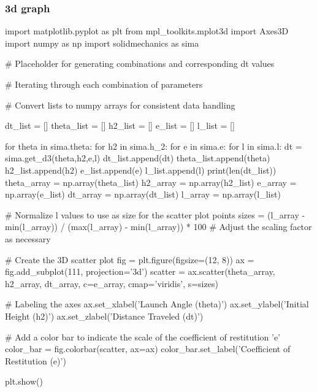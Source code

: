 \documentclass{article}
\begin{document}
    \subsubsection{3d graph}\label{ap:3d_code}
    \begin{python}
import matplotlib.pyplot as plt
from mpl_toolkits.mplot3d import Axes3D
import numpy as np
import solidmechanics as sima

# Placeholder for generating combinations and corresponding dt values

# Iterating through each combination of parameters
           


# Convert lists to numpy arrays for consistent data handling

dt_list = []
theta_list = []
h2_list = []
e_list = []
l_list = []

for theta in sima.theta:
        for h2 in sima.h_2:
            for e in sima.e:
                for l in sima.l:
                    dt = sima.get_d3(theta,h2,e,l)
                    dt_list.append(dt)
                    theta_list.append(theta)
                    h2_list.append(h2)
                    e_list.append(e)
                    l_list.append(l)
print(len(dt_list))
theta_array = np.array(theta_list)
h2_array = np.array(h2_list)
e_array = np.array(e_list)
dt_array = np.array(dt_list)
l_array = np.array(l_list)

# Normalize l values to use as size for the scatter plot points
sizes = (l_array - min(l_array)) / (max(l_array) - min(l_array)) * 100  # Adjust the scaling factor as necessary

# Create the 3D scatter plot
fig = plt.figure(figsize=(12, 8))
ax = fig.add_subplot(111, projection='3d')
scatter = ax.scatter(theta_array, h2_array, dt_array, c=e_array, cmap='viridis', s=sizes)

# Labeling the axes
ax.set_xlabel('Launch Angle (theta)')
ax.set_ylabel('Initial Height (h2)')
ax.set_zlabel('Distance Traveled (dt)')

# Add a color bar to indicate the scale of the coefficient of restitution 'e'
color_bar = fig.colorbar(scatter, ax=ax)
color_bar.set_label('Coefficient of Restitution (e)')

plt.show()

    \end{python}
\end{document}
